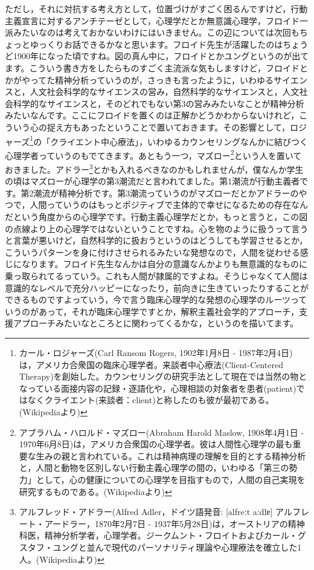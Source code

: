 \documentclass{ltjsbook}
\begin{document}
ただし，それに対抗する考え方として，位置づけがすごく困るんですけど，行動主義宣言に対するアンチテーゼとして，心理学だとか無意識心理学，フロイド一派みたいなのは考えておかないわけにはいきません。この辺については次回もちょっとゆっくりお話できるかなと思います。フロイド先生が活躍したのはちょうど1900年になった頃ですね。図の真ん中に，フロイドとかユングというのが出てます。こういう書き方をしたらものすごく主流派な気もしますけど，フロイドとかがやってた精神分析っていうのが，さっきも言ったように，いわゆるサイエンスと，人文社会科学的なサイエンスの営み，自然科学的なサイエンスと，人文社会科学的なサイエンスと，そのどれでもない第3の営みみたいなことが精神分析みたいなんです。ここにフロイドを置くのは正解かどうかわからないけれど，こういう心の捉え方もあったということで置いておきます。その影響として，ロジャーズ\footnote{カール・ロジャーズ(Carl Ransom Rogers, 1902年1月8日 - 1987年2月4日)は，アメリカ合衆国の臨床心理学者。来談者中心療法(Client-Centered Therapy)を創始した。カウンセリングの研究手法として現在では当然の物となっている面接内容の記録・逐語化や，心理相談の対象者を患者(patient)ではなくクライエント(来談者：client)と称したのも彼が最初である。(Wikipediaより)}の「クライエント中心療法」，いわゆるカウンセリングなんかに結びつく心理学者っていうのもでてきます。あともう一つ，マズロー\footnote{アブラハム・ハロルド・マズロー(Abraham Harold Maslow, 1908年4月1日 - 1970年6月8日)は，アメリカ合衆国の心理学者。彼は人間性心理学の最も重要な生みの親と言われている。これは精神病理の理解を目的とする精神分析と，人間と動物を区別しない行動主義心理学の間の，いわゆる「第三の勢力」として，心の健康についての心理学を目指すもので，人間の自己実現を研究するものである。(Wikipediaより)}という人を置いておきました。アドラー\footnote{アルフレッド・アドラー(Alfred Adler，ドイツ語発音: [alfreːt aːdlɐ] アルフレート・アードラー，1870年2月7日 - 1937年5月28日)は，オーストリアの精神科医，精神分析学者，心理学者。ジークムント・フロイトおよびカール・グスタフ・ユングと並んで現代のパーソナリティ理論や心理療法を確立した1人。(Wikipediaより)}とかも入れるべきなのかもしれませんが，僕なんか学生の頃はマズローが心理学の第3潮流だと言われてました。第1潮流が行動主義者です。第2潮流が精神分析です。第3潮流っていうのがマズローだとかアドラーのやつで，人間っていうのはもっとポジティブで主体的で幸せになるための存在なんだという角度からの心理学です。行動主義心理学だとか，もっと言うと，この図の点線より上の心理学ではないということですね。心を物のように扱うって言うと言葉が悪いけど，自然科学的に扱おうというのはどうしても学習させるとか，こういうパターンを身に付けさせられるみたいな発想なので，人間を従わせる感じになります。フロイド先生なんかは自分の意識なんかよりも無意識的なものに乗っ取られてるっていう。これも人間が隷属的ですよね。そうじゃなくて人間は意識的なレベルで充分ハッピーになったり，前向きに生きていったりすることができるものですよっていう，今で言う臨床心理学的な発想の心理学のルーツっていうのがあって，それが臨床心理学ですとか，解釈主義社会学的アプローチ，支援アプローチみたいなところとに関わってくるかな，というのを描いてます。
\end{document}
